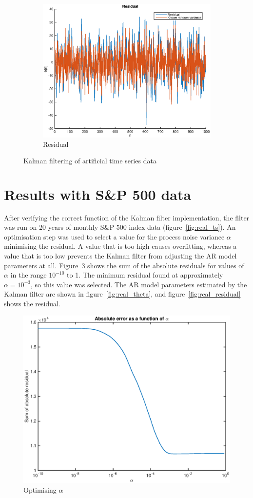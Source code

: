 \documentclass[12pt]{article}
\begin{document}
\begin{figure}
    \begin{subfigure}[b]{0.45\textwidth}
      \includegraphics[width=\textwidth]{figures/artificial_residual.eps}
      \caption{Residual}
      \label{fig:artificial_residual}
    \end{subfigure}
    \caption{Kalman filtering of artificial time series data}
  \end{figure}

  \section{Results with S\&P 500 data}

  After verifying the correct function of the Kalman filter implementation, the filter was run on 20 years of monthly S\&P 500 index data (figure~\ref{fig:real_ts}). An optimisation step was used to select a value for the process noise variance $\alpha$ minimising the residual. A value that is too high causes overfitting, whereas a value that is too low prevents the Kalman filter from adjusting the AR model parameters at all. Figure~\ref{fig:alpha} shows the sum of the absolute residuals for values of $\alpha$ in the range $10^{-10}$ to 1. The minimum residual found at approximately $\alpha = 10^{-3}$, so this value was selected. The AR model parameters estimated by the Kalman filter are shown in figure~\ref{fig:real_theta}, and figure~\ref{fig:real_residual} shows the residual.

  \begin{figure}
    \centering
    \includegraphics[width=0.45\linewidth]{figures/alpha.eps}
    \caption{Optimising $\alpha$}
    \label{fig:alpha}
  \end{figure}
\end{document}
